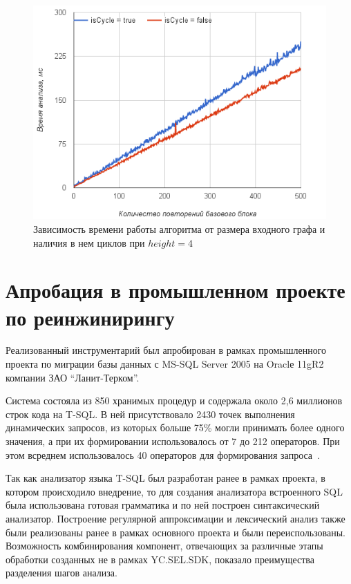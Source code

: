 \begin{figure}[h!]
 \centering
 \includegraphics[width=15cm]{pics/heigh4.png}
 \caption{Зависимость времени работы алгоритма от размера входного графа и наличия в нем циклов при $height=4$}
 \label{CycleVsLinear}
\end{figure}


\section{Апробация в промышленном проекте по реинжинирингу}

Реализованный инструментарий был апробирован в рамках промышленного проекта по миграции базы данных с MS-SQL Server 2005 на Oraclе 11gR2 компании ЗАО ``Ланит-Терком''.

Система состояла из 850 хранимых процедур и содержала около 2,6 миллионов строк кода на T-SQL. В ней присутствовало 2430 точек выполнения динамических запросов, из которых больше 75\% могли принимать более 
одного значения, а при их формировании использовалось от 7 до 212 операторов. При этом всреднем использовалось 40 операторов для формирования запроса~\cite{Syrcose}.

Так как анализатор языка T-SQL был разработан ранее в рамках проекта, в котором происходило внедрение, то для создания анализатора встроенного SQL была использована готовая грамматика и по ней построен 
синтаксический анализатор. Построение регулярной аппроксимации и лексический анализ также были реализованы ранее в рамках основного проекта и были переиспользованы. Возможность комбинирования компонент, 
отвечающих за различные этапы обработки 
созданных не в рамках YC.SEL.SDK, показало преимущества разделения шагов анализа.

